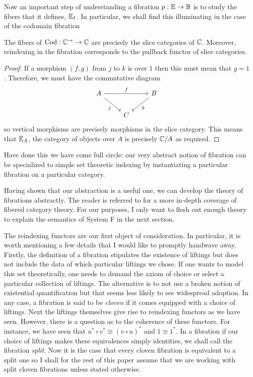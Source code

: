Now an important step of understanding a fibration
$p : \mathbb{E} \to \mathbb{B}$ is to study the fibers that it defines,
$\mathbb{E}_I$. In particular, we shall find this illuminating in the case
of the codomain fibration

\begin{lem}\label{lem:fibrations:fibersareslices}
  The fibers of $\operatorname{Cod} : \mathbb{C}^{\to} \to \mathbb{C}$ are precisely the slice
  categories of $\mathbb{C}$. Moreover, reindexing in the fibration
  corresponds to the pullback functor of slice categories.
\end{lem}
\begin{proof}
  If a morphism $(f, g)$ from $j$ to $k$ is over $1$ then this must
  mean that $g = 1$. Therefore, we must have the commutative diagram
  \[
    \begin{tikzcd}
      A \ar[rr, "f"] \ar[dr, swap, "j"] && B \ar[dl, "k"]\\
      & C &
    \end{tikzcd}
  \]
  so vertical morphisms are precisely morphisms in the slice
  category. This means that $\mathbb{E}_A$, the category of objects over
  $A$ is precisely $\mathbb{C}/A$ as required.
\end{proof}

Have done this we have come full circle: our very abstract notion of
fibration can be specialized to simple set theoretic indexing by
instantiating a particular fibration on a particular category.

Having shown that our abstraction is a useful one, we can develop the
theory of fibrations abstractly. The reader is referred to
\citet{Jacobs:01} for a more in-depth coverage of fibered category
theory. For our purposes, I only want to flesh out enough theory to
explain the semantics of System F in the next section.

The reindexing functors are our first object of consideration. In
particular, it is worth mentioning a few details that I would like to
promptly handwave away. Firstly, the definition of a fibration
stipulates the existence of liftings but does not include the data of
which particular liftings we chose. If one wants to model this set
theoretically, one needs to demand the axiom of choice or select a
particular collection of liftings. The alternative is to not use a
broken notion of existential quantification but that seems less likely
to see widespread adoption. In any case, a fibration is said to be
\emph{cloven} if it comes equipped with a choice of liftings. Next the
liftings themselves give rise to reindexing functors as we have
seen. However, there is a question as to the coherence of these
functors. For instance, we have seen that
$u^* \circ v^* \cong (v \circ u)^*$ and $1 \cong 1^*$. In a fibration
if our choice of liftings makes these equivalences simply identities,
we shall call the fibration \emph{split}. Now it is the case that
every cloven fibration is equivalent to a split one so I shall for the
rest of this paper assume that we are working with split cloven
fibrations unless stated otherwise.

